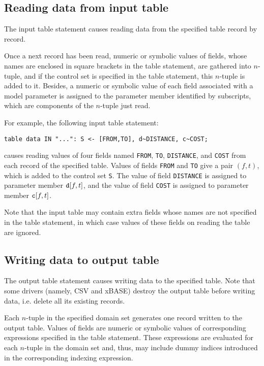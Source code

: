\documentclass[11pt]{report}
\begin{document}
\subsection{Reading data from input table}

The input table statement causes reading data from the specified table
record by record.

Once a next record has been read, numeric or symbolic values of fields,
whose names are enclosed in square brackets in the table statement, are
gathered into $n$-tuple, and if the control set is specified in the
table statement, this $n$-tuple is added to it. Besides, a numeric or
symbolic value of each field associated with a model parameter is
assigned to the parameter member identified by subscripts, which are
components of the $n$-tuple just read.

For example, the following input table statement:

\noindent\hfil
\verb|table data IN "...": S <- [FROM,TO], d~DISTANCE, c~COST;|

\noindent
causes reading values of four fields named {\tt FROM}, {\tt TO},
{\tt DISTANCE}, and {\tt COST} from each record of the specified table.
Values of fields {\tt FROM} and {\tt TO} give a pair $(f,t)$, which is
added to the control set {\tt S}. The value of field {\tt DISTANCE} is
assigned to parameter member ${\tt d}[f,t]$, and the value of field
{\tt COST} is assigned to parameter member ${\tt c}[f,t]$.

Note that the input table may contain extra fields whose names are not
specified in the table statement, in which case values of these fields
on reading the table are ignored.

\subsection{Writing data to output table}

The output table statement causes writing data to the specified table.
Note that some drivers (namely, CSV and xBASE) destroy the output table
before writing data, i.e. delete all its existing records.

Each $n$-tuple in the specified domain set generates one record written
to the output table. Values of fields are numeric or symbolic values of
corresponding expressions specified in the table statement. These
expressions are evaluated for each $n$-tuple in the domain set and,
thus, may include dummy indices introduced in the corresponding indexing
expression.
\end{document}
